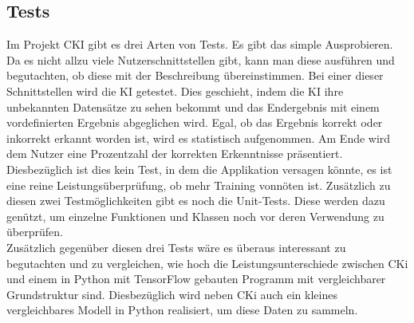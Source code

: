 \subsection{Tests}
\label{sec:DesignTests}
Im Projekt CKI gibt es drei Arten von Tests. Es gibt das simple Ausprobieren. Da es nicht allzu viele Nutzerschnittstellen gibt, kann man diese ausführen und begutachten, ob diese mit der Beschreibung übereinstimmen.
Bei einer dieser Schnittstellen wird die KI getestet. Dies geschieht, indem die KI ihre unbekannten Datensätze zu sehen bekommt und das Endergebnis mit einem vordefinierten Ergebnis abgeglichen wird.
Egal, ob das Ergebnis korrekt oder inkorrekt erkannt worden ist, wird es statistisch aufgenommen. Am Ende wird dem Nutzer eine Prozentzahl der korrekten Erkenntnisse präsentiert. Diesbezüglich ist dies kein Test, in dem die Applikation versagen könnte, es ist eine reine Leistungsüberprüfung, ob mehr Training vonnöten ist.
Zusätzlich zu diesen zwei Testmöglichkeiten gibt es noch die Unit-Tests. Diese werden dazu genützt, um einzelne Funktionen und Klassen noch vor deren Verwendung zu überprüfen.
\\
Zusätzlich gegenüber diesen drei Tests wäre es überaus interessant zu begutachten und zu vergleichen, wie hoch die Leistungsunterschiede zwischen CKi und einem in Python mit TensorFlow gebauten Programm mit vergleichbarer Grundstruktur sind. Diesbezüglich wird neben CKi auch ein kleines vergleichbares Modell in Python realisiert, um diese Daten zu sammeln.



